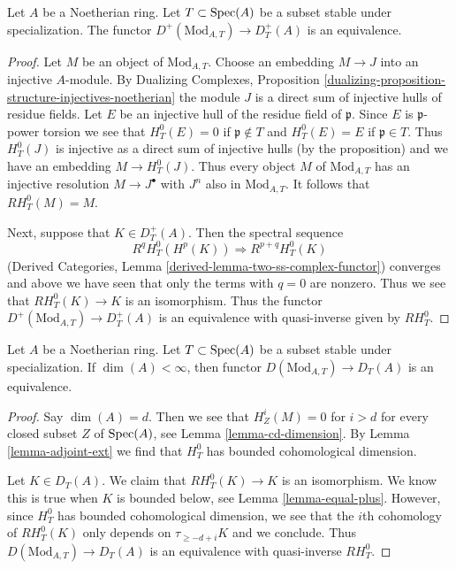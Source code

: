 \begin{lemma}
\label{lemma-equal-plus}
Let $A$ be a Noetherian ring. Let $T \subset \mathop{\mathrm{Spec}}(A)$ be a subset stable
under specialization. The functor $D^+(\text{Mod}_{A, T}) \to D^+_T(A)$
is an equivalence.
\end{lemma}

\begin{proof}
Let $M$ be an object of $\text{Mod}_{A, T}$. Choose an embedding
$M \to J$ into an injective $A$-module. By
Dualizing Complexes, Proposition
\ref{dualizing-proposition-structure-injectives-noetherian}
the module $J$ is a direct sum of injective hulls of residue fields.
Let $E$ be an injective hull of the residue field of $\mathfrak p$.
Since $E$ is $\mathfrak p$-power torsion we see that
$H^0_T(E) = 0$ if $\mathfrak p \not \in T$ and
$H^0_T(E) = E$ if $\mathfrak p \in T$.
Thus $H^0_T(J)$ is injective as a direct sum of injective hulls
(by the proposition) and we have an embedding $M \to H^0_T(J)$.
Thus every object $M$ of $\text{Mod}_{A, T}$ has an injective resolution
$M \to J^\bullet$ with $J^n$ also in $\text{Mod}_{A, T}$. It follows
that $RH^0_T(M) = M$.

\medskip\noindent
Next, suppose that $K \in D_T^+(A)$. Then the spectral sequence
$$
R^qH^0_T(H^p(K)) \Rightarrow R^{p + q}H^0_T(K)
$$
(Derived Categories, Lemma \ref{derived-lemma-two-ss-complex-functor})
converges and above we have seen that only the terms with $q = 0$
are nonzero. Thus we see that $RH^0_T(K) \to K$ is an isomorphism.
Thus the functor $D^+(\text{Mod}_{A, T}) \to D^+_T(A)$
is an equivalence with quasi-inverse given by $RH^0_T$.
\end{proof}

\begin{lemma}
\label{lemma-equal-full}
Let $A$ be a Noetherian ring. Let $T \subset \mathop{\mathrm{Spec}}(A)$ be a subset stable
under specialization. If $\dim(A) < \infty$, then functor
$D(\text{Mod}_{A, T}) \to D_T(A)$ is an equivalence.
\end{lemma}

\begin{proof}
Say $\dim(A) = d$. Then we see that $H^i_Z(M) = 0$ for $i > d$
for every closed subset $Z$ of $\mathop{\mathrm{Spec}}(A)$, see
Lemma \ref{lemma-cd-dimension}.
By Lemma \ref{lemma-adjoint-ext} we find that $H^0_T$ has bounded
cohomological dimension.

\medskip\noindent
Let $K \in D_T(A)$. We claim that $RH^0_T(K) \to K$ is an
isomorphism. We know this is true when $K$ is bounded below, see
Lemma \ref{lemma-equal-plus}. However, since $H^0_T$ has bounded
cohomological dimension, we see that the $i$th cohomology of
$RH_T^0(K)$ only depends on $\tau_{\geq -d + i}K$ and we conclude.
Thus $D(\text{Mod}_{A, T}) \to D_T(A)$ is an equivalence with
quasi-inverse $RH^0_T$.
\end{proof}

